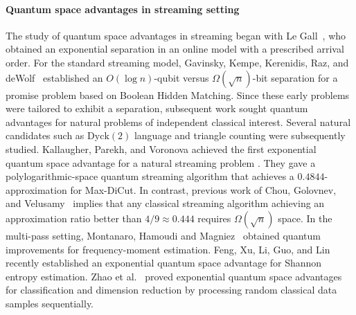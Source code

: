 \paragraph{Quantum space advantages in streaming setting} 
The study of quantum space advantages in streaming began with Le Gall~\cite{LeGall2006}, who obtained an exponential separation in an online model with a prescribed arrival order.  For the standard streaming model, Gavinsky, Kempe, Kerenidis,
Raz, and deWolf~\cite{GavinskyKempeKerenidisRazDeWolf2008} established an $O(\log n)$-qubit versus $\Omega(\sqrt n)$-bit separation for a promise problem based on Boolean Hidden Matching.  Since these early problems were tailored to exhibit a separation, subsequent work sought quantum advantages for natural problems of independent classical
interest.  Several natural candidates such as $\mathrm{Dyck}(2)$ language \cite{JainNayak2014,NayakTouchette2017} and triangle counting \cite{Kallaugher2022} were subsequently studied. Kallaugher, Parekh, and Voronova achieved the first exponential quantum space advantage for a natural streaming problem \cite{KPV23}. They gave a polylogarithmic-space quantum streaming algorithm that achieves a $0.4844$-approximation for Max-DiCut. In contrast, previous work of Chou, Golovnev, and Velusamy~\cite{CGV20} implies that any classical streaming algorithm achieving an approximation ratio better than $4/9 \approx 0.444$ requires $\Omega(\sqrt n)$ space. 
In the multi-pass setting, Montanaro, Hamoudi and Magniez~\cite{Montanaro2016,HamoudiMagniez2019}
obtained quantum improvements for frequency-moment estimation. Feng, Xu, Li, Guo, and Lin~\cite{FengEtAl2026} recently established an exponential quantum space advantage for Shannon entropy estimation. 
Zhao et al.~\cite{zhao2026exponential} proved exponential quantum space advantages for classification and dimension reduction by processing random classical data samples sequentially.


